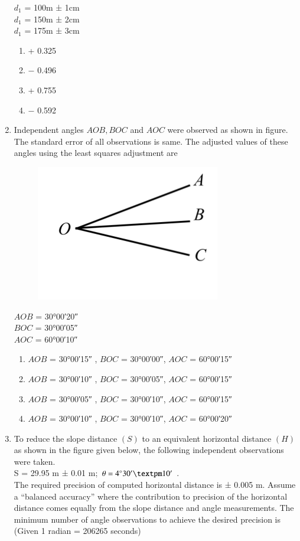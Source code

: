 \documentclass[12pt]{article}
\begin{document}
\begin{enumerate}
  $d_1$ = 100m ± 1cm\\ 
  $d_1$ = 150m ± 2cm \\
  $d_1$ = 175m ± 3cm 

  \begin{enumerate}
    \item + 0.325 
   \item $-$ 0.496 
   \item + 0.755 
   \item $-$ 0.592
  \end{enumerate}

\item Independent angles $AOB, BOC$ and $AOC$ were observed as shown in figure. The
standard error of all observations is same. The adjusted values of these angles
using the least squares adjustment are 

 \begin{figure}[H]
\centering
\includegraphics[width=0.5\linewidth]{Figs/LatexImage5.png}
\end{figure}

  $AOB$ = \ang{30;00;20} \\
  $BOC$ = \ang{30;00;05}\\
  $AOC$ = \ang{60;00;10} 

  \begin{enumerate}
    \item $AOB$ = \ang{30;00;15} , $BOC$ = \ang{30;00;00}, $AOC$ = \ang{60;00;15} 
   \item $AOB$ = \ang{30;00;10} , $BOC$ = \ang{30;00;05}, $AOC$ = \ang{60;00;15} 
   \item $AOB$ = \ang{30;00;05} , $BOC$ = \ang{30;00;10}, $AOC$ = \ang{60;00;15} 
   \item $AOB$ = \ang{30;00;10} , $BOC$ = \ang{30;00;10}, $AOC$ = \ang{60;00;20}
  \end{enumerate}

\item To reduce the slope distance $(S)$ to an equivalent horizontal distance $(H)$ as shown in the figure given below, the following independent observations were taken.\\
  S = 29.95 m ± 0.01 m; $\theta = 4\degree 30' ± 10'$ . \\
  The required precision of computed horizontal distance is ± 0.005 m. Assume a “balanced accuracy” where the contribution to precision of the horizontal distance comes equally from the slope distance and angle measurements. The minimum number of angle observations to achieve the desired precision is\\ 
   (Given 1 radian = 206265 seconds) \\


\end{enumerate}
\end{document}
